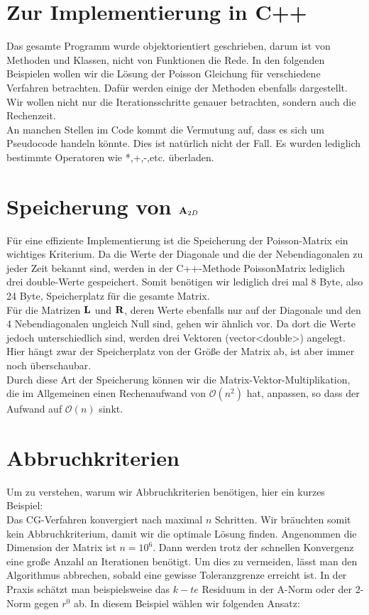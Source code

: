 \section{Zur Implementierung in C++}

Das gesamte Programm wurde objektorientiert geschrieben, darum ist von Methoden und Klassen, nicht von Funktionen die Rede. In den folgenden Beispielen wollen wir die Lösung der Poisson Gleichung für verschiedene Verfahren betrachten. Dafür werden einige der Methoden ebenfalls dargestellt. Wir wollen nicht nur die Iterationsschritte genauer betrachten, sondern auch die Rechenzeit.\\
An manchen Stellen im Code kommt die Vermutung auf, dass es sich um Pseudocode handeln könnte. Dies ist natürlich nicht der Fall. Es wurden lediglich bestimmte Operatoren wie *,+,-,etc. überladen.

\section{Speicherung von ${\textbf{A}}_{2D}$}

Für eine effiziente Implementierung ist die Speicherung der Poisson-Matrix ein wichtiges Kriterium. Da die Werte der Diagonale und die der Nebendiagonalen zu jeder Zeit bekannt sind, werden in der C++-Methode PoissonMatrix lediglich drei double-Werte gespeichert. Somit benötigen wir lediglich drei mal 8 Byte, also 24 Byte, Speicherplatz für die gesamte Matrix.\\
Für die Matrizen ${\textbf{L}}$ und ${\textbf{R}}$, deren Werte ebenfalls nur auf der Diagonale und den 4 Nebendiagonalen ungleich Null sind, gehen wir ähnlich vor. Da dort die Werte jedoch unterschiedlich sind, werden drei Vektoren (vector<double>) angelegt. Hier hängt zwar der Speicherplatz von der Größe der Matrix ab, ist aber immer noch überschaubar.\\
Durch diese Art der Speicherung können wir die Matrix-Vektor-Multiplikation, die im Allgemeinen einen Rechenaufwand von $\mathcal{O}(n^{2})$ hat, anpassen, so dass der Aufwand auf $\mathcal{O}(n)$ sinkt.



\section{Abbruchkriterien}

Um zu verstehen, warum wir Abbruchkriterien benötigen, hier ein kurzes Beispiel:\\
Das CG-Verfahren konvergiert nach maximal $n$ Schritten. Wir bräuchten somit kein Abbruchkriterium, damit wir die optimale Lösung finden. Angenommen die Dimension der Matrix ist $n = 10^{6}$. Dann werden trotz der schnellen Konvergenz eine große Anzahl an Iterationen benötigt. Um dies zu vermeiden, lässt man den Algorithmus abbrechen, sobald eine gewisse Toleranzgrenze erreicht ist. In der Praxis schätzt man beispielsweise das $k-te$ Residuum in der A-Norm oder der 2-Norm gegen $r^{0}$ ab. In diesem Beispiel wählen wir folgenden Ansatz:

